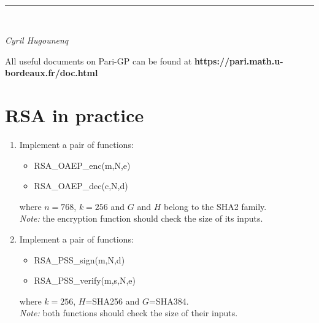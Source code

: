 \documentclass[12pt]{article}
\begin{document}
\begin{minipage}{.3\textwidth}%
\end{minipage} \hfill
{}\\\hrule \ \\
\begin{minipage}[t]{0.5\textwidth}\sf\textit{Cyril Hugounenq}
\end{minipage} \hfill%
\vspace{0.5em}

All useful documents on Pari-GP can be found at {\bf https://pari.math.u-bordeaux.fr/doc.html}

\section{RSA in practice}
\begin{enumerate}
	\item Implement a pair of functions:
	\begin{itemize}
		\item RSA\_OAEP\_enc(m,N,e)
		\item RSA\_OAEP\_dec(c,N,d)
	\end{itemize}
where $n=768$, $k=256$ and $G$ and $H$ belong to the SHA2 family.\\
{\it Note:} the encryption function should check the size of its inputs.
	\item Implement a pair of functions:
	\begin{itemize}
		\item RSA\_PSS\_sign(m,N,d)
		\item RSA\_PSS\_verify(m,s,N,e)
	\end{itemize}
where $k=256$, $H$=SHA256 and $G$=SHA384.\\
{\it Note:} both functions should check the size of their inputs.
\end{enumerate}
\end{document}
